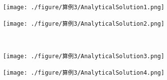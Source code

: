 \documentclass{Sichuan Normal University}
\begin{document}
\begin{figure}[H]
    \centering
    \begin{minipage}[c]{0.48\textwidth}
    \centering
    \texttt{[image: ./figure/算例3/AnalyticalSolution1.png]}
    \end{minipage}
    \hspace{0.02\textwidth}
    \begin{minipage}[c]{0.48\textwidth}
    \centering
    \texttt{[image: ./figure/算例3/AnalyticalSolution2.png]}
    \end{minipage}\\[3mm]
    \begin{minipage}[t]{0.48\textwidth}
    \centering
    \label{fig:算例1解析解}
    \end{minipage}
    \hspace{0.02\textwidth}
    \begin{minipage}[t]{0.48\textwidth}
    \centering
    \label{fig:算例2解析解}
    \end{minipage}
    \centering
    \begin{minipage}[c]{0.48\textwidth}
    \centering
    \texttt{[image: ./figure/算例3/AnalyticalSolution3.png]}
    \end{minipage}
    \hspace{0.02\textwidth}
    \begin{minipage}[c]{0.48\textwidth}
    \centering
    \texttt{[image: ./figure/算例3/AnalyticalSolution4.png]}
    \end{minipage}\\[3mm]
    \begin{minipage}[t]{0.48\textwidth}
    \centering
    \label{fig:算例3解析解}
    \end{minipage}
    \hspace{0.02\textwidth}
    \begin{minipage}[t]{0.48\textwidth}
    \centering
    \label{fig:算例4解析解}
    \end{minipage}
    \end{figure}
  
\end{document}
